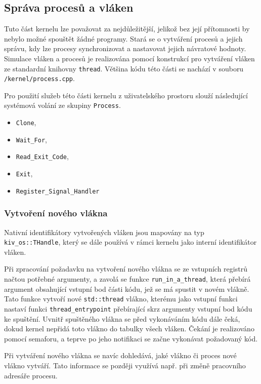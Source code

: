 \documentclass[12pt, a4paper]{article}
\begin{document}
\subsection{Správa procesů a vláken}
Tuto část kernelu lze považovat za nejdůležitější, jelikož bez její přítomnosti by nebylo možné spouštět žádné programy. Stará se o vytváření procesů a jejich správu, kdy lze procesy synchronizovat a nastavovat jejich návratové hodnoty. Simulace vláken a procesů je realizována pomocí konstrukcí pro vytváření vláken ze standardní knihovny \texttt{thread}. Většina kódu této části se nachází v souboru \texttt{/kernel/process.cpp}.

Pro použití služeb této části kernelu z uživatelského prostoru slouží následující systémová volání ze skupiny \texttt{Process}.

\begin{itemize}
    \item \texttt{Clone},
    \item \texttt{Wait\_For},
    \item \texttt{Read\_Exit\_Code},
    \item \texttt{Exit},
    \item \texttt{Register\_Signal\_Handler}
\end{itemize}

\subsubsection{Vytvoření nového vlákna}

Nativní identifikátory vytvořených vláken jsou mapovány na typ \texttt{kiv\_os::THandle}, který se dále používá v rámci kernelu jako interní identifikátor vláken.

Při zpracování požadavku na vytvoření nového vlákna se ze vstupních registrů načtou potřebné argumenty, a zavolá se funkce \texttt{run\_in\_a\_thread}, která přebírá argument obsahující vstupní bod části kódu, jež se má spustit v novém vlákně. Tato funkce vytvoří nové \texttt{std::thread} vlákno, kterému jako vstupní funkci nastaví funkci \texttt{thread\_entrypoint} přebírající skrz argumenty vstupní bod kódu ke spuštění. Uvnitř spuštěného vlákna se před vykonáváním kódu dále čeká, dokud kernel nepřidá toto vlákno do tabulky všech vláken. Čekání je realizováno pomocí semaforu, a teprve po jeho notifikaci se začne vykonávat požadovaný kód. 

Při vytváření nového vlákna se navíc dohledává, jaké vlákno či proces nové vlákno vytváří. Tato informace se později využívá např. při změně pracovního adresáře procesu.
\end{document}
